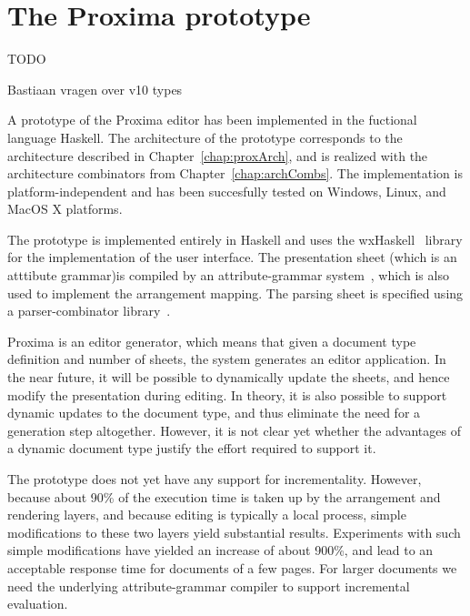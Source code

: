 \chapter{The Proxima prototype} \label{chap:prototype}

\bc TODO

Bastiaan vragen over v10 types
\ec


A prototype of the Proxima editor has been implemented in the fuctional language Haskell. The architecture of the prototype corresponds to the architecture described in Chapter~\ref{chap:proxArch}, and is realized with the architecture combinators from Chapter~\ref{chap:archCombs}. The implementation is platform-independent and has been succesfully tested on Windows, Linux, and MacOS X platforms. 

The prototype is implemented entirely in Haskell and uses the wxHaskell~\cite{leijen04wxHaskell} library for the implementation of the user interface. The presentation sheet \bc (which is an atttibute grammar)\ec  is compiled by an  attribute-grammar system~\cite{swierstra04ag}, which is also used to implement the arrangement mapping. The parsing sheet is specified using a parser-combinator library~\cite{swierstra01parsers}.


Proxima is an editor generator, which means that given a document type definition and number of sheets, the system generates an editor application. In the near future, it will be possible to dynamically update the sheets, and hence modify the presentation during editing. In theory, it is also possible to support dynamic updates to the document type, and thus eliminate the need for a generation step altogether. However, it is not clear yet whether the advantages of a dynamic document type justify the effort required to support it.


The prototype does not yet have any support for incrementality. However, because about 90\% 
of the execution time is taken up by the arrangement and rendering layers, and because editing is typically a local process, simple modifications to these two layers yield substantial results. Experiments with such simple modifications have yielded an  increase of about 900\%,
and lead to an acceptable response time for documents of a few pages. For larger documents we need the underlying attribute-grammar compiler to support incremental evaluation.

